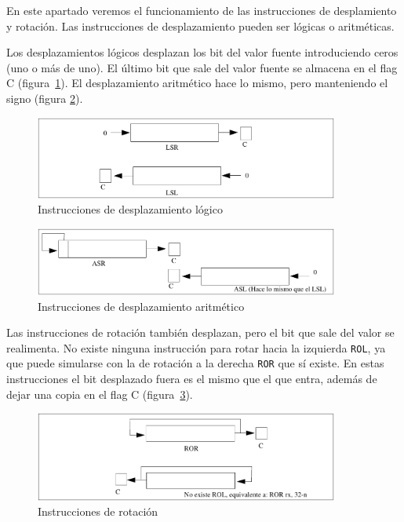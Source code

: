 En este apartado veremos el funcionamiento de las instrucciones de
desplamiento y rotación. Las instrucciones de desplazamiento pueden
ser lógicas o aritméticas.

Los desplazamientos lógicos desplazan los bit del valor fuente
introduciendo ceros (uno o más de uno). El último bit que sale del valor
fuente se almacena en el flag C (figura~\ref{fig:instrSHIFT}).
El desplazamiento aritmético hace lo mismo, pero manteniendo el signo
(figura \ref{fig:instrSHIFTarit}).

\begin{figure}[h]
  \centering
    \includegraphics[width=10cm]{graphs/lsrlsl.pdf}
  \caption{Instrucciones de desplazamiento lógico}
  \label{fig:instrSHIFT}
\end{figure}

\begin{figure}[h]
  \centering
    \includegraphics[width=10cm]{graphs/asrasl.pdf}
  \caption{Instrucciones de desplazamiento aritmético}
  \label{fig:instrSHIFTarit}
\end{figure}

Las instrucciones de rotación también desplazan, pero el bit que sale del
valor se realimenta. No existe ninguna instrucción para rotar hacia la
izquierda {\tt ROL}, ya que puede simularse con la de rotación a la derecha
{\tt ROR} que sí existe. En estas instrucciones el bit desplazado fuera
es el mismo que el que entra, además de dejar una copia
en el flag C (figura~\ref{fig:instrRotacion}).

\begin{figure}[h]
  \centering
    \includegraphics[width=10cm]{graphs/rorrol.pdf}
  \caption{Instrucciones de rotación}
  \label{fig:instrRotacion}
\end{figure}

